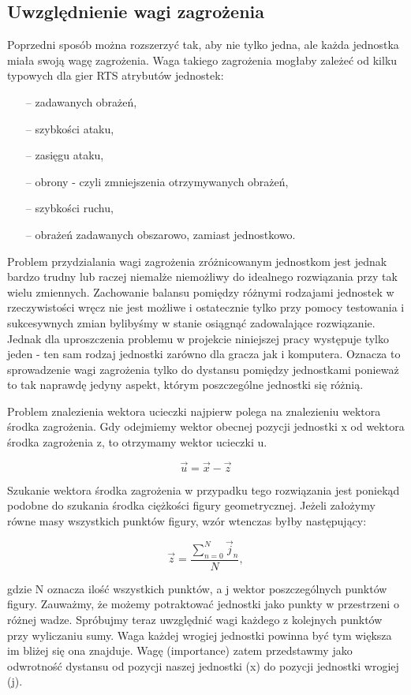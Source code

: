 \documentclass[12pt]{report}
\begin{document}
\subsection{Uwzględnienie wagi zagrożenia}
Poprzedni sposób można rozszerzyć tak, aby nie tylko jedna, ale każda jednostka miała swoją wagę zagrożenia. Waga takiego zagrożenia mogłaby zależeć od kilku typowych dla gier RTS atrybutów jednostek:
\begin{itemize}
\item[--] zadawanych obrażeń,
\item[--] szybkości ataku,
\item[--] zasięgu ataku,
\item[--] obrony - czyli zmniejszenia otrzymywanych obrażeń,
\item[--] szybkości ruchu,
\item[--] obrażeń zadawanych obszarowo, zamiast jednostkowo.
\end{itemize}
Problem przydzialania wagi zagrożenia zróżnicowanym jednostkom jest jednak bardzo trudny lub raczej niemalże niemożliwy do idealnego rozwiązania przy tak wielu zmiennych. Zachowanie balansu pomiędzy różnymi rodzajami jednostek w rzeczywistości wręcz nie jest możliwe i ostatecznie tylko przy pomocy testowania i sukcesywnych zmian bylibyśmy w stanie osiągnąć zadowalające rozwiązanie. 
Jednak dla uproszczenia problemu w projekcie niniejszej pracy występuje tylko jeden - ten sam rodzaj jednostki zarówno dla gracza jak i komputera. Oznacza to sprowadzenie wagi zagrożenia tylko do dystansu pomiędzy jednostkami ponieważ to tak naprawdę jedyny aspekt, którym poszczególne jednostki się różnią.

Problem znalezienia wektora ucieczki najpierw polega na znalezieniu wektora środka zagrożenia. Gdy odejmiemy wektor obecnej pozycji jednostki x od wektora środka zagrożenia z, to otrzymamy wektor ucieczki u.

$$\vec u = \vec x - \vec z   $$

Szukanie wektora środka zagrożenia w przypadku tego rozwiązania jest poniekąd podobne do szukania środka ciężkości figury geometrycznej. Jeżeli założymy równe masy wszystkich punktów figury, wzór wtenczas byłby następujący:

$$\vec z = \dfrac{\sum_{n=0}^{N}  \vec j_n}{N},   $$ 

gdzie N oznacza ilość wszystkich punktów, a j wektor poszczególnych punktów figury. Zauważmy, że możemy potraktować jednostki jako punkty w przestrzeni o różnej wadze. Spróbujmy teraz uwzględnić wagi każdego z kolejnych punktów przy wyliczaniu sumy. Waga każdej wrogiej jednostki powinna być tym większa im bliżej się ona znajduje. Wagę (importance) zatem przedstawmy jako odwrotność dystansu od pozycji naszej jednostki (x) do pozycji jednostki wrogiej (j).
\end{document}
